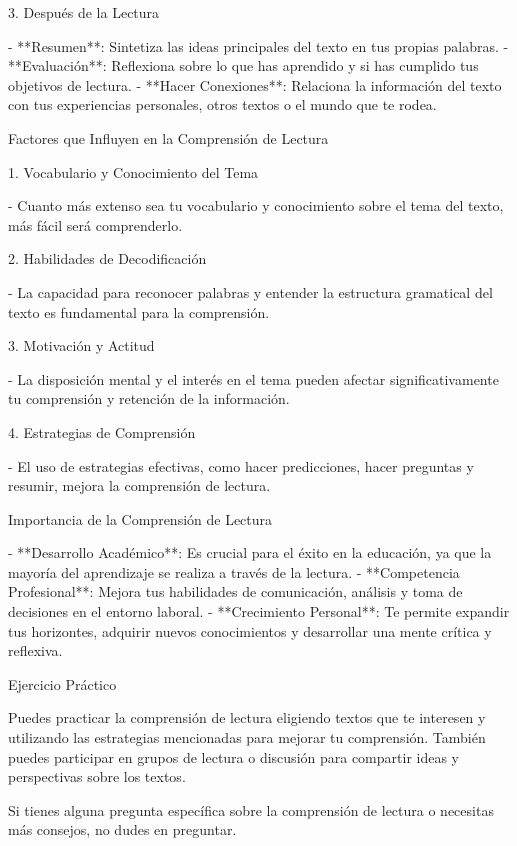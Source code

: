  3. Después de la Lectura

- **Resumen**: Sintetiza las ideas principales del texto en tus propias palabras.
- **Evaluación**: Reflexiona sobre lo que has aprendido y si has cumplido tus objetivos de lectura.
- **Hacer Conexiones**: Relaciona la información del texto con tus experiencias personales, otros textos o el mundo que te rodea.

 Factores que Influyen en la Comprensión de Lectura

 1. Vocabulario y Conocimiento del Tema

- Cuanto más extenso sea tu vocabulario y conocimiento sobre el tema del texto, más fácil será comprenderlo.

 2. Habilidades de Decodificación

- La capacidad para reconocer palabras y entender la estructura gramatical del texto es fundamental para la comprensión.

 3. Motivación y Actitud

- La disposición mental y el interés en el tema pueden afectar significativamente tu comprensión y retención de la información.

 4. Estrategias de Comprensión

- El uso de estrategias efectivas, como hacer predicciones, hacer preguntas y resumir, mejora la comprensión de lectura.

 Importancia de la Comprensión de Lectura

- **Desarrollo Académico**: Es crucial para el éxito en la educación, ya que la mayoría del aprendizaje se realiza a través de la lectura.
- **Competencia Profesional**: Mejora tus habilidades de comunicación, análisis y toma de decisiones en el entorno laboral.
- **Crecimiento Personal**: Te permite expandir tus horizontes, adquirir nuevos conocimientos y desarrollar una mente crítica y reflexiva.

 Ejercicio Práctico

Puedes practicar la comprensión de lectura eligiendo textos que te interesen y utilizando las estrategias mencionadas para mejorar tu comprensión. También puedes participar en grupos de lectura o discusión para compartir ideas y perspectivas sobre los textos.

Si tienes alguna pregunta específica sobre la comprensión de lectura o necesitas más consejos, no dudes en preguntar.